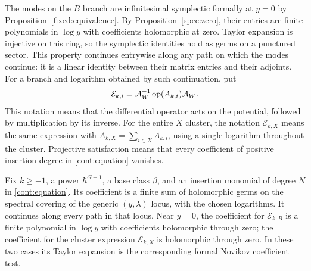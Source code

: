 The modes on the $B$ branch are infinitesimal symplectic
formally at $y=0$ by Proposition~\ref{fixed:equivalence}.
By Proposition~\ref{spec:zero}, their entries are finite
polynomials in $\log y$ with coefficients holomorphic at
zero. Taylor expansion is injective on this ring, so the
symplectic identities hold as germs on a punctured sector.
This property
continues entrywise along any path on which the modes continue:
it is a linear identity between their matrix entries and their
adjoints. For a branch and logarithm obtained by such
continuation, put
\begin{equation}
 \mathcal E_{k,i}
   =\mathcal A_W^{-1}\operatorname{op}(A_{k,i})\mathcal A_W .
 \label{cont:equation}
\end{equation}
This notation means that the differential operator acts on the
potential, followed by multiplication by its inverse.
For the entire $X$ cluster, the notation $\mathcal E_{k,X}$
means the same expression with $A_{k,X}=\sum_{i\in X}A_{k,i}$,
using a single logarithm throughout the cluster. Projective
satisfaction means that every coefficient of positive insertion
degree in \eqref{cont:equation} vanishes.

\begin{lemma}
\label{cont:finite-tests}
Fix $k\geq-1$, a power $\hbar^{G-1}$, a base class $\beta$, and an
insertion monomial of degree $N$ in \eqref{cont:equation}.
Its coefficient is a finite sum of holomorphic germs on the
spectral covering of the generic $(y,\lambda)$ locus, with the
chosen logarithms. It continues along every path in that locus.
Near $y=0$, the coefficient for $\mathcal E_{k,B}$ is a finite
polynomial in $\log y$ with coefficients holomorphic through
zero; the coefficient for the cluster expression
$\mathcal E_{k,X}$ is holomorphic through zero. In these two cases its
Taylor expansion is the corresponding formal Novikov coefficient
test.
\end{lemma}

